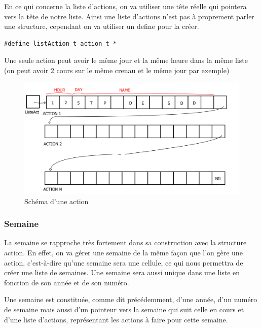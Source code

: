 \documentclass[11pt]{article}
\begin{document}
En ce qui concerne la liste d'actions, on va utiliser une tête réelle qui pointera
vers la tête de notre liste. Ainsi une liste d'actions n'est pas à proprement
parler une structure, cependant on va utiliser un define pour la créer.

\begin{lstlisting}
#define listAction_t action_t *
\end{lstlisting}

Une seule action peut avoir le même jour et la même heure dans la même liste (on peut avoir 2 cours sur le même crenau et le même jour par exemple)

\begin{figure}[htbp]
\centering
\includegraphics[width=.9\linewidth]{./act.jpg}
\caption{\label{fig:org76f1275}Schéma d'une action}
\end{figure}

\subsubsection{Semaine}
\label{sec:org40e960d}

La semaine se rapproche très fortement dans sa construction avec la structure action. En effet, on va gérer une semaine de la même façon que l'on gère une action, c'est-à-dire qu'une semaine sera une cellule, ce qui nous permettra de créer une liste de semaines. Une semaine sera aussi unique dans
une liste en fonction de son année et de son numéro.

Une semaine est constituée, comme dit précédemment, d'une année, d'un numéro de semaine mais aussi d'un pointeur vers la semaine qui suit celle en cours et d'une liste d'actions, représentant les actions à faire pour cette semaine.
\end{document}
